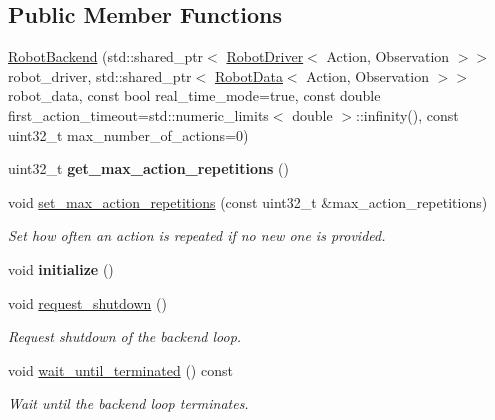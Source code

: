 \subsection*{Public Member Functions}
\begin{DoxyCompactItemize}
\item 
\hyperlink{classrobot__interfaces_1_1RobotBackend_af454a09b5d269ed32b0ae2d35abdb833}{Robot\+Backend} (std\+::shared\+\_\+ptr$<$ \hyperlink{classrobot__interfaces_1_1RobotDriver}{Robot\+Driver}$<$ Action, Observation $>$$>$ robot\+\_\+driver, std\+::shared\+\_\+ptr$<$ \hyperlink{classrobot__interfaces_1_1RobotData}{Robot\+Data}$<$ Action, Observation $>$$>$ robot\+\_\+data, const bool real\+\_\+time\+\_\+mode=true, const double first\+\_\+action\+\_\+timeout=std\+::numeric\+\_\+limits$<$ double $>$\+::infinity(), const uint32\+\_\+t max\+\_\+number\+\_\+of\+\_\+actions=0)
\item 
\mbox{\label{classrobot__interfaces_1_1RobotBackend_ae354dfd960d4fd0d2f9242dcfb4a701f}} 
uint32\+\_\+t {\bfseries get\+\_\+max\+\_\+action\+\_\+repetitions} ()
\item 
void \hyperlink{classrobot__interfaces_1_1RobotBackend_aad761d1e0ab7296a9632b9c4cc9c91db}{set\+\_\+max\+\_\+action\+\_\+repetitions} (const uint32\+\_\+t \&max\+\_\+action\+\_\+repetitions)
\begin{DoxyCompactList}\small\item\em Set how often an action is repeated if no new one is provided. \end{DoxyCompactList}\item 
\mbox{\label{classrobot__interfaces_1_1RobotBackend_a7e4eb9f5362b79c0c21b824e3b639ae6}} 
void {\bfseries initialize} ()
\item 
void \hyperlink{classrobot__interfaces_1_1RobotBackend_a3da1748227b56acf7b745aff64023715}{request\+\_\+shutdown} ()
\begin{DoxyCompactList}\small\item\em Request shutdown of the backend loop. \end{DoxyCompactList}\item 
\mbox{\label{classrobot__interfaces_1_1RobotBackend_ad4e9c9fda8d3bbab60b1896df1e1e78b}} 
void \hyperlink{classrobot__interfaces_1_1RobotBackend_ad4e9c9fda8d3bbab60b1896df1e1e78b}{wait\+\_\+until\+\_\+terminated} () const
\begin{DoxyCompactList}\small\item\em Wait until the backend loop terminates. \end{DoxyCompactList}\end{DoxyCompactItemize}
